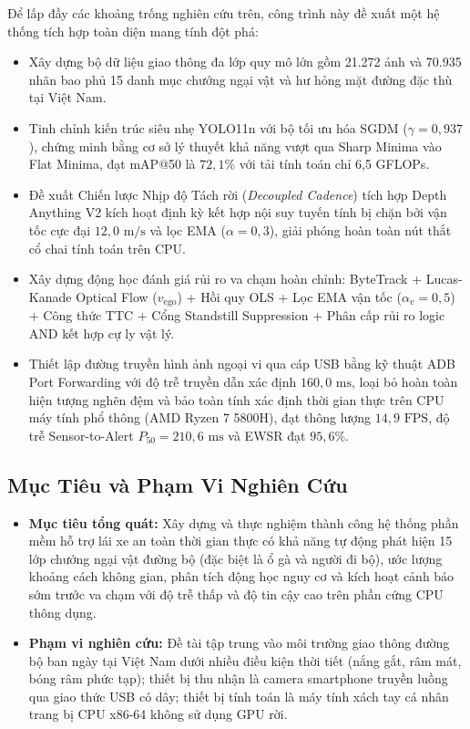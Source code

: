 \documentclass[12pt,a4paper]{article}
\begin{document}
Để lấp đầy các khoảng trống nghiên cứu trên, công trình này đề xuất một hệ thống tích hợp toàn diện mang tính đột phá:
\begin{itemize}
    \item Xây dựng bộ dữ liệu giao thông đa lớp quy mô lớn gồm 21.272 ảnh và 70.935 nhãn bao phủ 15 danh mục chướng ngại vật và hư hỏng mặt đường đặc thù tại Việt Nam.
    \item Tinh chỉnh kiến trúc siêu nhẹ YOLO11n với bộ tối ưu hóa SGDM ($\gamma = 0,937$), chứng minh bằng cơ sở lý thuyết khả năng vượt qua Sharp Minima vào Flat Minima, đạt mAP@50 là $72,1\%$ với tải tính toán chỉ 6,5 GFLOPs.
    \item Đề xuất Chiến lược Nhịp độ Tách rời (\textit{Decoupled Cadence}) tích hợp Depth Anything V2 kích hoạt định kỳ kết hợp nội suy tuyến tính bị chặn bởi vận tốc cực đại $12,0\text{ m/s}$ và lọc EMA ($\alpha = 0,3$), giải phóng hoàn toàn nút thắt cổ chai tính toán trên CPU.
    \item Xây dựng động học đánh giá rủi ro va chạm hoàn chỉnh: ByteTrack + Lucas-Kanade Optical Flow ($v_{\text{ego}}$) + Hồi quy OLS + Lọc EMA vận tốc ($\alpha_v = 0,5$) + Công thức TTC + Cổng Standstill Suppression + Phân cấp rủi ro logic AND kết hợp cự ly vật lý.
    \item Thiết lập đường truyền hình ảnh ngoại vi qua cáp USB bằng kỹ thuật ADB Port Forwarding với độ trễ truyền dẫn xác định $160,0\text{ ms}$, loại bỏ hoàn toàn hiện tượng nghẽn đệm và bảo toàn tính xác định thời gian thực trên CPU máy tính phổ thông (AMD Ryzen 7 5800H), đạt thông lượng $14,9\text{ FPS}$, độ trễ Sensor-to-Alert $P_{50} = 210,6\text{ ms}$ và EWSR đạt $95,6\%$.
\end{itemize}

\subsection{Mục Tiêu và Phạm Vi Nghiên Cứu}
\begin{itemize}
    \item \textbf{Mục tiêu tổng quát:} Xây dựng và thực nghiệm thành công hệ thống phần mềm hỗ trợ lái xe an toàn thời gian thực có khả năng tự động phát hiện 15 lớp chướng ngại vật đường bộ (đặc biệt là ổ gà và người đi bộ), ước lượng khoảng cách không gian, phân tích động học nguy cơ và kích hoạt cảnh báo sớm trước va chạm với độ trễ thấp và độ tin cậy cao trên phần cứng CPU thông dụng.
    \item \textbf{Phạm vi nghiên cứu:} Đề tài tập trung vào môi trường giao thông đường bộ ban ngày tại Việt Nam dưới nhiều điều kiện thời tiết (nắng gắt, râm mát, bóng râm phức tạp); thiết bị thu nhận là camera smartphone truyền luồng qua giao thức USB có dây; thiết bị tính toán là máy tính xách tay cá nhân trang bị CPU x86-64 không sử dụng GPU rời.
\end{itemize}
\end{document}
